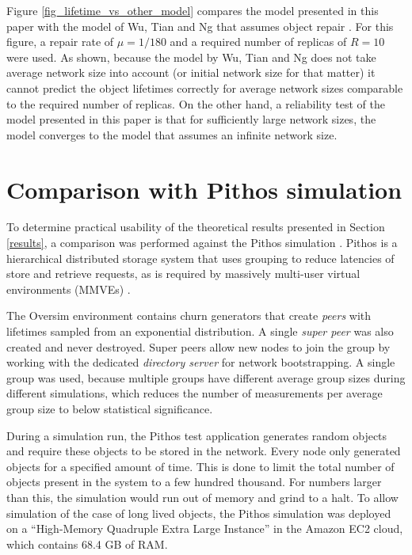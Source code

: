 \documentclass[10pt,a4paper,conference]{IEEEtran}
\begin{document}
Figure \ref{fig_lifetime_vs_other_model} compares the model presented in this paper with the model of Wu, Tian and Ng that assumes object repair \cite{replication_article}. For this figure, a repair rate of $\mu = 1/180$ and a required number of replicas of $R = 10$ were used. As shown, because the model by Wu, Tian and Ng does not take average network size into account (or initial network size for that matter) it cannot predict the object lifetimes correctly for average network sizes comparable to the required number of replicas. On the other hand, a reliability test of the model presented in this paper is that for sufficiently large network sizes, the model converges to the model that assumes an infinite network size.

\section{Comparison with Pithos simulation}
\label{simulation}

To determine practical usability of the theoretical results presented in Section \ref{results}, a comparison was performed against the Pithos simulation \cite{Pithos_mmve_2011}. Pithos is a hierarchical distributed storage system that uses grouping to reduce latencies of store and retrieve requests, as is required by massively multi-user virtual environments (MMVEs) \cite{gilmore_p2p_mmog_state_persistency}.

The Oversim environment contains churn generators that create \emph{peers} with lifetimes sampled from an exponential distribution. A single \emph{super peer} was also created and never destroyed. Super peers allow new nodes to join the group by working with the dedicated \emph{directory server} for network bootstrapping. A single group was used, because multiple groups have different average group sizes during different simulations, which reduces the number of measurements per average group size to below statistical significance.

During a simulation run, the Pithos test application generates random objects and require these objects to be stored in the network. Every node only generated objects for a specified amount of time. This is done to limit the total number of objects present in the system to a few hundred thousand. For numbers larger than this, the simulation would run out of memory and grind to a halt. To allow simulation of the case of long lived objects, the Pithos simulation was deployed on a ``High-Memory Quadruple Extra Large Instance'' in the Amazon EC2 cloud, which contains 68.4 GB of RAM.
\end{document}
